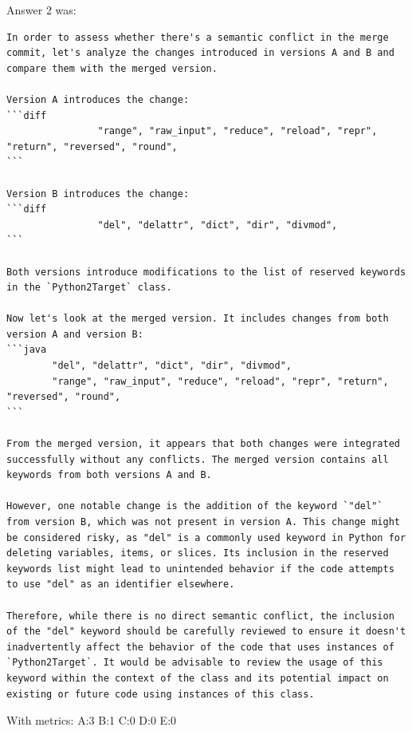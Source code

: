 Answer 2 was:
\begin{lstlisting}
In order to assess whether there's a semantic conflict in the merge commit, let's analyze the changes introduced in versions A and B and compare them with the merged version.

Version A introduces the change:
```diff
                "range", "raw_input", "reduce", "reload", "repr", "return", "reversed", "round",
```

Version B introduces the change:
```diff
                "del", "delattr", "dict", "dir", "divmod",
```

Both versions introduce modifications to the list of reserved keywords in the `Python2Target` class.

Now let's look at the merged version. It includes changes from both version A and version B:
```java
		"del", "delattr", "dict", "dir", "divmod",
		"range", "raw_input", "reduce", "reload", "repr", "return", "reversed", "round",
```

From the merged version, it appears that both changes were integrated successfully without any conflicts. The merged version contains all keywords from both versions A and B.

However, one notable change is the addition of the keyword `"del"` from version B, which was not present in version A. This change might be considered risky, as "del" is a commonly used keyword in Python for deleting variables, items, or slices. Its inclusion in the reserved keywords list might lead to unintended behavior if the code attempts to use "del" as an identifier elsewhere.

Therefore, while there is no direct semantic conflict, the inclusion of the "del" keyword should be carefully reviewed to ensure it doesn't inadvertently affect the behavior of the code that uses instances of `Python2Target`. It would be advisable to review the usage of this keyword within the context of the class and its potential impact on existing or future code using instances of this class.  
\end{lstlisting}

With metrics:
A:3
B:1
C:0
D:0
E:0

